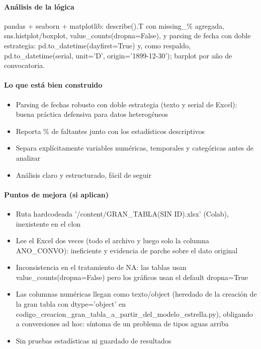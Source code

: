 \paragraph{Análisis de la lógica}
pandas + seaborn + matplotlib: describe().T con missing\_\% agregada, sns.histplot/boxplot, value\_counts(dropna=False), y parsing de fecha con doble estrategia: pd.to\_datetime(dayfirst=True) y, como respaldo, pd.to\_datetime(serial, unit='D', origin='1899-12-30'); barplot por año de convocatoria.

\paragraph{Lo que está bien construido}
\begin{itemize}
  \item Parsing de fechas robusto con doble estrategia (texto y serial de Excel): buena práctica defensiva para datos heterogéneos
  \item Reporta \% de faltantes junto con los estadísticos descriptivos
  \item Separa explícitamente variables numéricas, temporales y categóricas antes de analizar
  \item Análisis claro y estructurado, fácil de seguir
\end{itemize}

\paragraph{Puntos de mejora (si aplican)}
\begin{itemize}
  \item Ruta hardcodeada '/content/GRAN\_TABLA(SIN ID).xlsx' (Colab), inexistente en el clon
  \item Lee el Excel dos veces (todo el archivo y luego solo la columna ANO\_CONVO): ineficiente y evidencia de parche sobre el dato original
  \item Inconsistencia en el tratamiento de NA: las tablas usan value\_counts(dropna=False) pero los gráficos usan el default dropna=True
  \item Las columnas numéricas llegan como texto/object (heredado de la creación de la gran tabla con dtype='object' en codigo\_creacion\_gran\_tabla\_a\_partir\_del\_modelo\_estrella.py), obligando a conversiones ad hoc: síntoma de un problema de tipos aguas arriba
  \item Sin pruebas estadísticas ni guardado de resultados
\end{itemize}


